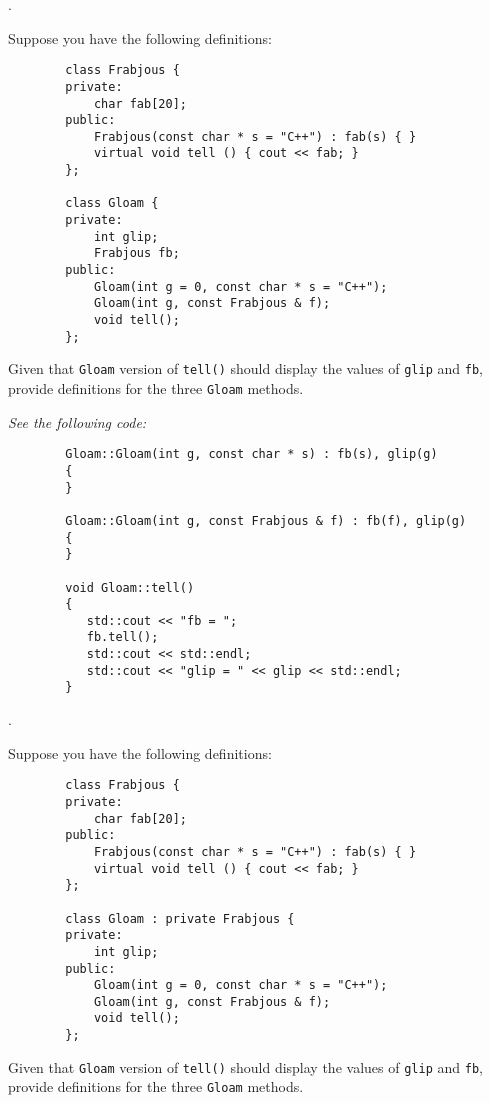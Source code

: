 \documentclass{amsart}
\begin{document}
\phantom{\quad}
\vfill
{}. 
\begin{minipage}[t]{11.5 cm}
	Suppose you have the following definitions:
	\begin{verbatim}
		class Frabjous {
		private:
		    char fab[20];
		public:
		    Frabjous(const char * s = "C++") : fab(s) { }
		    virtual void tell () { cout << fab; }
		};

		class Gloam {
		private:
		    int glip;
		    Frabjous fb;
		public:
		    Gloam(int g = 0, const char * s = "C++");
		    Gloam(int g, const Frabjous & f);
		    void tell();
		};
	\end{verbatim}
	Given that \texttt{Gloam} version of \texttt{tell()} should display the values of \texttt{glip} and \texttt{fb}, provide definitions for the three \texttt{Gloam} methods.
\end{minipage}

\vfill

\phantom{2. } 
\begin{minipage}[t]{11.5 cm}
	{\slshape 
		See the following code:
	}
	\begin{verbatim}
		Gloam::Gloam(int g, const char * s) : fb(s), glip(g)
		{
		}

		Gloam::Gloam(int g, const Frabjous & f) : fb(f), glip(g)
		{
		}

		void Gloam::tell()
		{
		   std::cout << "fb = ";
		   fb.tell();
		   std::cout << std::endl;
		   std::cout << "glip = " << glip << std::endl;
		}
	\end{verbatim} 
\end{minipage} 
\vfill
\newpage

\phantom{\quad}
\vfill
{}. 
\begin{minipage}[t]{11.5 cm}
	Suppose you have the following definitions:
	\begin{verbatim}
		class Frabjous {
		private:
		    char fab[20];
		public:
		    Frabjous(const char * s = "C++") : fab(s) { }
		    virtual void tell () { cout << fab; }
		};

		class Gloam : private Frabjous {
		private:
		    int glip;
		public:
		    Gloam(int g = 0, const char * s = "C++");
		    Gloam(int g, const Frabjous & f);
		    void tell();
		};
	\end{verbatim}
Given that \texttt{Gloam} version of \texttt{tell()} should display the values of \texttt{glip} and \texttt{fb}, provide definitions for the three \texttt{Gloam} methods.
\end{minipage}
\end{document}
